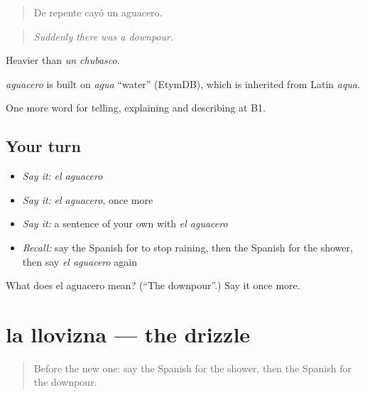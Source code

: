 \begin{quote}
De repente cayó un aguacero.
\end{quote}

\begin{quote}
\emph{Suddenly there was a downpour.}
\end{quote}

Heavier than \emph{un chubasco}.

\begin{cousinweb}
\emph{aguacero} is built on \emph{agua} \textquotedblleft{}water\textquotedblright{} (EtymDB), which is inherited from Latin \emph{aqua}.
\end{cousinweb}

\begin{grammarlens}[title={What you've built}]
One more word for telling, explaining and describing at B1.
\end{grammarlens}

\subsection*{Your turn}
\begin{itemize}
\raggedright
  \item \emph{Say it:} \emph{el aguacero}
  \item \emph{Say it:} \emph{el aguacero}, once more
  \item \emph{Say it:} a sentence of your own with \emph{el aguacero}
  \item \emph{Recall:} say the Spanish for to stop raining, then the Spanish for the shower, then say \emph{el aguacero} again
\end{itemize}

\begin{tcolorbox}[breakable,colback=teal!4,colframe=teal!35!black,title={Before you move on}]
What does el aguacero mean? (\textquotedblleft{}The downpour\textquotedblright{}.) Say it once more.
\end{tcolorbox}
\section[la llovizna]{la llovizna — the drizzle}

\label{lesson:ES-C697-llovizna}



\begin{quote}
Before the new one: say the Spanish for the shower, then the Spanish for the downpour.
\end{quote}

